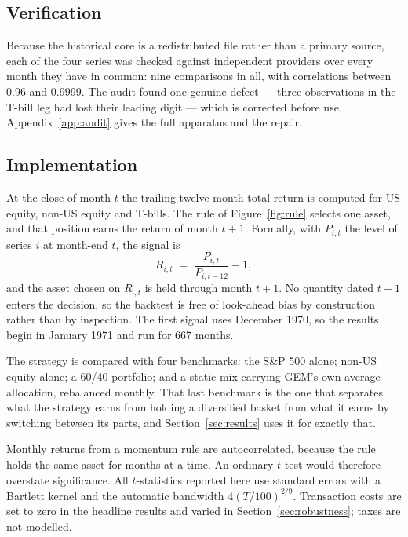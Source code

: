 \documentclass[11pt,a4paper]{article}
\let\oldsubsection\subsection
\renewcommand{\subsection}{\FloatBarrier\oldsubsection}
\begin{document}
\subsection{Verification}

Because the historical core is a redistributed file rather than a primary
source, each of the four series was checked against independent providers over
every month they have in common: nine comparisons in all, with correlations
between 0.96 and 0.9999. The audit found one genuine defect --- three
observations in the T-bill leg had lost their leading digit --- which is
corrected before use. Appendix~\ref{app:audit} gives the full apparatus and the
repair.

\subsection{Implementation}

At the close of month $t$ the trailing twelve-month total return is computed for
US equity, non-US equity and T-bills. The rule of Figure~\ref{fig:rule} selects
one asset, and that position earns the return of month $t+1$. Formally, with
$P_{i,t}$ the level of series $i$ at month-end $t$, the signal is
\[
  R_{i,t} \;=\; \frac{P_{i,t}}{P_{i,t-12}} - 1 ,
\]
and the asset chosen on $R_{\cdot,t}$ is held through month $t+1$. No quantity
dated $t+1$ enters the decision, so the backtest is free of look-ahead bias by
construction rather than by inspection. The first signal uses December 1970, so
the results begin in January 1971 and run for 667 months.

The strategy is compared with four benchmarks: the S\&P 500 alone; non-US
equity alone; a 60/40 portfolio; and a static mix carrying GEM's own average
allocation, rebalanced monthly. That last benchmark is the one that separates
what the strategy earns from holding a diversified basket from what it earns by
switching between its parts, and Section~\ref{sec:results} uses it for exactly
that.

Monthly returns from a momentum rule are autocorrelated, because the rule holds
the same asset for months at a time. An ordinary $t$-test would therefore
overstate significance. All $t$-statistics reported here use
\citet{newey1987} standard errors with a Bartlett kernel and the automatic
bandwidth $4(T/100)^{2/9}$. Transaction costs are set to zero in the headline
results and varied in Section~\ref{sec:robustness}; taxes are not modelled.

\end{document}
